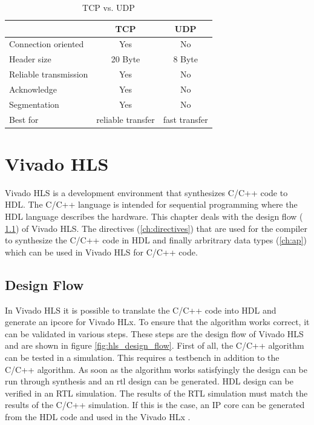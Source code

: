 \begin{table}[h]
    \centering
    \begin{tabular}{ l  c  c }
        \toprule
         & \textbf{TCP} & \textbf{UDP} \\
        \midrule
        Connection oriented & Yes & No \\
        Header size & 20 Byte & 8 Byte \\
        Reliable transmission & Yes & No \\
        Acknowledge & Yes & No \\
        Segmentation & Yes & No \\
        Best for & reliable transfer & fast transfer  \\
        \bottomrule
    \end{tabular}
    \caption{TCP vs. UDP}
    \label{tab:tcpudp}
\end{table}

\section{Vivado HLS} \label{ch:th:hls}
Vivado HLS is a development environment that synthesizes C/C++ code to HDL. The
C/C++ language is intended for sequential programming where the HDL language
describes the hardware. This chapter deals with the design flow (
\ref{ch:design_flow}) of Vivado HLS. The directives (\ref{ch:directives}) that
are used for the compiler to synthesize the C/C++ code in HDL and finally arbritrary data types (\ref{ch:ap}) which can be used in Vivado HLS for C/C++ code.

\subsection{Design Flow} \label{ch:design_flow}
In Vivado HLS it is possible to translate the C/C++ code into HDL and generate
an \gls{ipcore} for Vivado HLx. To ensure that the algorithm works correct, it
can be validated in various steps. These steps are the design flow of Vivado HLS and are shown in figure \ref{fig:hls_design_flow}.
First of all, the C/C++ algorithm can be tested in a simulation. This requires a
testbench in addition to the C/C++ algorithm. As soon as the algorithm works
satisfyingly the design can be run through synthesis and an \gls{rtl} design can
be
generated. HDL design can be verified in an RTL simulation. The results of the
RTL
simulation must match the results of the C/C++ simulation. If this is the case,
an IP core can be generated from the HDL code and used in the Vivado HLx \cite{vivado_hls}.

